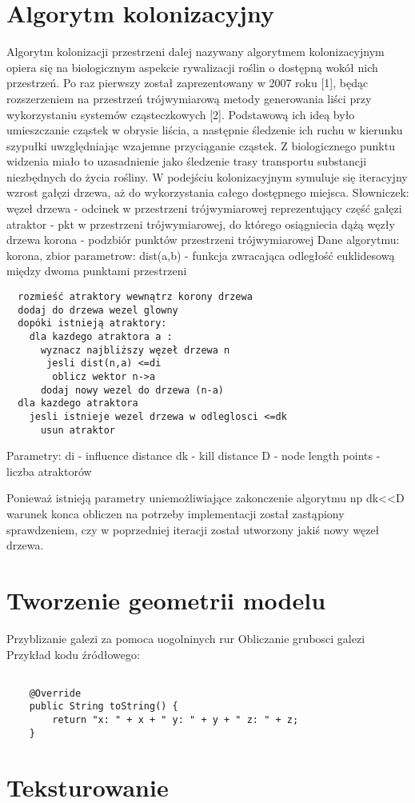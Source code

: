 \section{Algorytm kolonizacyjny}
Algorytm kolonizacji przestrzeni dalej nazywany algorytmem kolonizacyjnym 
opiera się na biologicznym aspekcie rywalizacji roślin o dostępną 
wokół nich przestrzeń. Po raz pierwszy został zaprezentowany w 2007 roku [1], będąc
rozszerzeniem na przestrzeń trójwymiarową metody generowania liści przy wykorzystaniu
systemów cząsteczkowych [2]. Podstawową ich ideą było umieszczanie cząstek w obrysie liścia,
a następnie śledzenie ich ruchu w kierunku szypułki uwzględniając wzajemne przyciąganie cząstek.
Z biologicznego punktu widzenia miało to uzasadnienie jako śledzenie trasy transportu substancji niezbędnych do życia rośliny.
W podejściu kolonizacyjnym symuluje się iteracyjny wzrost gałęzi drzewa, aż do wykorzystania całego dostępnego miejsca.
Słowniczek:
węzeł drzewa - odcinek w przestrzeni trójwymiarowej reprezentujący część gałęzi
atraktor - pkt w przestrzeni trójwymiarowej, do którego osiągniecia dążą węzły drzewa
korona - podzbiór punktów przestrzeni trójwymiarowej
Dane algorytmu:
korona, zbior parametrow:
dist(a,b) - funkcja zwracająca odległość euklidesową między dwoma punktami przestrzeni 
\begin{verbatim}
  rozmieść atraktory wewnątrz korony drzewa
  dodaj do drzewa wezel glowny
  dopóki istnieją atraktory:
    dla kazdego atraktora a :
      wyznacz najbliższy węzeł drzewa n
       jesli dist(n,a) <=di
        oblicz wektor n->a
      dodaj nowy wezel do drzewa (n-a)
  dla kazdego atraktora
    jesli istnieje wezel drzewa w odleglosci <=dk
      usun atraktor
\end{verbatim}
Parametry:
di - influence distance
dk - kill distance
D - node length
points - liczba atraktorów

Ponieważ istnieją parametry uniemożliwiające zakonczenie algorytmu np dk<<D warunek konca obliczen na potrzeby implementacji został
zastąpiony sprawdzeniem, czy w poprzedniej iteracji został utworzony jakiś nowy węzeł drzewa.
\section{Tworzenie geometrii modelu}

Przyblizanie galezi za pomoca uogolninych rur
Obliczanie grubosci galezi
Przykład kodu źródłowego:

\begin{verbatim}
    
    @Override
    public String toString() {
        return "x: " + x + " y: " + y + " z: " + z;
    }

\end{verbatim}

\section{Teksturowanie}